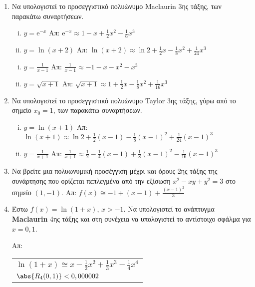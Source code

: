 \documentclass[a4paper]{report}
\newcommand{\twocolumnsidesss}[2]{\begin{minipage}[t]{0.52\linewidth}\raggedright
    #1
    \end{minipage}\hspace{2pt}\hfill{\color{Col1}{\vrule width 1pt}}\hfill\begin{minipage}[t]{0.47\linewidth}\raggedright
    #2
  \end{minipage}
}
\begin{document}
\begin{center}
\minibox{\large\bfseries \textcolor{Col1}{Ασκήσεις Taylor και Maclaurin}}
\end{center}

\vspace{\baselineskip}

\begin{enumerate}


  \item Να υπολογιστεί το προσεγγιστικό πολυώνυμο Maclaurin 3ης τάξης, των 
    παρακάτω συναρτήσεων.

    \twocolumnsidesss{
      \begin{enumerate}[i)]
        \item $ y= \mathrm{e}^{-x} $ 
          \hfill Απ: $ \mathrm{e}^{-x} \approx 1-x+ \frac{1}{2} x^{2} - \frac{1}{6} x^{3} $ 
        \item $ y= \ln{(x+2)} $ \;
          \hfill Απ: $ \ln{(x+2)} \approx \ln{2} + \frac{1}{2} x - \frac{1}{8} x^{2} +
          \frac{1}{24} x^{3} $ 
      \end{enumerate}
    }{
      \begin{enumerate}[i),start=3]
        \item $ y= \frac{1}{x-1} $ \hfill Απ: $ \frac{1}{x-1} \approx -1 -x -x^{2} - x^{3} $ 
        \item $ y= \sqrt{x+1} $ \hfill Απ: $ \sqrt{x+1} \approx 1 + \frac{1}{2} x -
          \frac{1}{8} x^{2} + \frac{1}{16} x^{3} $ 
      \end{enumerate}
    }

  \item  Να υπολογιστεί το προσεγγιστικό πολυώνυμο Taylor 3ης τάξης, γύρω από 
    το σημείο $ x_{0}=1 $, των παρακάτω συναρτήσεων.
    \begin{enumerate}[i)]
      \item $ y= \ln{(x+1)} $ 
        \hfill Απ: $ \ln{(x+1)} \approx \ln{2} + \frac{1}{2} (x-1) - \frac{1}{8}
        (x-1)^{2} + \frac{1}{24} (x-1)^{3} $ 
      \item $ y= \frac{1}{x+1} $ \hfill Απ: $ \frac{1}{x+1} \approx \frac{1}{2} -
        \frac{1}{4} (x-1) + \frac{1}{8} (x-1)^{2} - \frac{1}{16} (x-1)^{3} $ 
    \end{enumerate}

  \item Να βρείτε μια πολυωνυμική προσέγγιση μέχρι και 
    όρους 2ης τάξης της συνάρτησης που ορίζεται πεπλεγμένα από την εξίσωση 
    $ x^{2} - xy + y^{2} = 3$ στο σημείο $ (1,-1) $.
    \hfill Απ: $f(x) \cong -1 + (x-1) + \frac{(x-1)^{2}}{3} $

  \item Έστω $ f(x) = \ln{(1+x)} $, $ x>-1 $. Να υπολογιστεί το ανάπτυγμα
    \textbf{Maclaurin} 4ης τάξης και στη συνέχεια να υπολογιστεί το αντίστοιχο 
    σφάλμα για $ x = 0,1 $.

    \hfill Απ: \begin{tabular}{l}
      $ \ln(1+x) \cong x - \frac{1}{2} x^{2} + \frac{1}{3}x^{3} - 
      \frac{1}{4} x^{4} $ \\ 
      $ \abs{R_{4}(0,1)} < 0,000002$	
    \end{tabular}

\end{enumerate}
\end{document}
